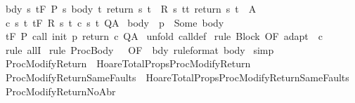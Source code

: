 \begin{isabellebody}
\ bdy{\isacharcolon}\ {\isachardoublequoteopen}{\isasymforall}s{\isachardot}\ {\isasymGamma}{\isacharcomma}{\isasymTheta}{\isasymturnstile}\isactrlsub t\isactrlbsub {\isacharslash}F\isactrlesub \ {\isacharparenleft}P{\isacharprime}\ s{\isacharparenright}\ body\ {\isacharbraceleft}t{\isachardot}\ return\ s\ t\ {\isasymin}\ R\ s\ t{\isacharbraceright}{\isacharcomma}{\isacharbraceleft}t{\isachardot}\ return\ s\ t\ {\isasymin}\ A{\isacharbraceright}{\isachardoublequoteclose}\isanewline
{}\ c{\isacharcolon}\ {\isachardoublequoteopen}{\isasymforall}s\ t{\isachardot}\ {\isasymGamma}{\isacharcomma}{\isasymTheta}{\isasymturnstile}\isactrlsub t\isactrlbsub {\isacharslash}F\isactrlesub \ {\isacharparenleft}R\ s\ t{\isacharparenright}\ {\isacharparenleft}c\ s\ t{\isacharparenright}\ Q{\isacharcomma}A{\isachardoublequoteclose}\isanewline
{}\ body{\isacharcolon}\ {\isachardoublequoteopen}{\isasymGamma}\ p\ {\isacharequal}\ Some\ body{\isachardoublequoteclose}\isanewline
{}\ {\isachardoublequoteopen}{\isasymGamma}{\isacharcomma}{\isasymTheta}{\isasymturnstile}\isactrlsub t\isactrlbsub {\isacharslash}F\isactrlesub \ P\ {\isacharparenleft}call\ init\ p\ return\ c{\isacharparenright}\ Q{\isacharcomma}A{\isachardoublequoteclose}\isanewline
%
\isadelimproof
%
\endisadelimproof
%
\isatagproof
{}\isamarkupfalse%
\ {\isacharparenleft}unfold\ call{\isacharunderscore}def{\isacharparenright}\isanewline
{}\isamarkupfalse%
\ {\isacharparenleft}rule\ Block\ {\isacharbrackleft}OF\ adapt\ {\isacharunderscore}\ c{\isacharbrackright}{\isacharparenright}\isanewline
{}\isamarkupfalse%
\ {\isacharparenleft}rule\ allI{\isacharparenright}\isanewline
{}\isamarkupfalse%
\ {\isacharparenleft}rule\ ProcBody\ {\isacharbrackleft}\ {\isasymGamma}{\isacharequal}{\isasymGamma}{\isacharcomma}\ OF\ {\isacharunderscore}\ bdy\ {\isacharbrackleft}rule{\isacharunderscore}format{\isacharbrackright}\ body{\isacharbrackright}{\isacharparenright}\isanewline
{}\isamarkupfalse%
\ simp\isanewline
{}\isamarkupfalse%
%
\endisatagproof
{\isafoldproof}%
%
\isadelimproof
\isanewline
%
\endisadelimproof
\isanewline
{}\isamarkupfalse%
\ ProcModifyReturn\ {\isacharequal}\ HoareTotalProps{\isachardot}ProcModifyReturn\isanewline
{}\isamarkupfalse%
\ ProcModifyReturnSameFaults\ {\isacharequal}\ HoareTotalProps{\isachardot}ProcModifyReturnSameFaults\isanewline
\isanewline
{}\isamarkupfalse%
\ ProcModifyReturnNoAbr{\isacharcolon}\isanewline

\end{isabellebody}
